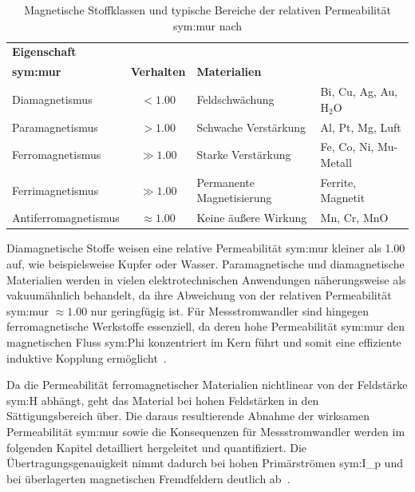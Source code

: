 \begin{table}[H]
    \centering
    \caption{Magnetische Stoffklassen und typische Bereiche der relativen Permeabilität \gls{sym:mur} nach \cite[Tab.~48]{book-Taschenbuch_Physik-Kuchling}}
    \label{tab:magnetische_stoffeigenschaften}
    \begin{tabularx}{\linewidth}{l c l X}
        \toprule
        \textbf{Eigenschaft} & 
        \thead{\textbf{Permeabilität}                                                                                  \\ \textbf{\gls{sym:mur}}} & 
        \textbf{Verhalten}   & 
        \textbf{Materialien}                                                                                           \\ 
        \midrule
        Diamagnetismus       & $< \num{1,00}$       & Feldschwächung            & Bi, Cu, Ag, Au, $\text{H}_2\text{O}$ \\
        Paramagnetismus      & $> \num{1,00}$       & Schwache Verstärkung      & Al, Pt, Mg, Luft                     \\
        Ferromagnetismus     & $\gg \num{1,00}$     & Starke Verstärkung        & Fe, Co, Ni, Mu-Metall                \\
        Ferrimagnetismus     & $\gg \num{1,00}$     & Permanente Magnetisierung & Ferrite, Magnetit                    \\
        Antiferromagnetismus & $\approx \num{1,00}$ & Keine äußere Wirkung      & Mn, Cr, MnO                          \\
        \bottomrule
    \end{tabularx}
\end{table}

Diamagnetische Stoffe weisen eine relative Permeabilität \gls{sym:mur} kleiner als \num{1,00} auf, wie beispielsweise Kupfer oder Wasser. Paramagnetische und diamagnetische Materialien werden in vielen elektrotechnischen Anwendungen näherungsweise als vakuumähnlich behandelt, da ihre Abweichung von der relativen Permeabilität \gls{sym:mur} $\approx \num{1,00}$ nur geringfügig ist. Für Messstromwandler sind hingegen ferromagnetische Werkstoffe essenziell, da deren hohe Permeabilität \gls{sym:mur} den magnetischen Fluss \gls{sym:Phi} konzentriert im Kern führt und somit eine effiziente induktive Kopplung ermöglicht~\cite[Tab.~48]{book-Taschenbuch_Physik-Kuchling}\cite[S.~63]{book-Technologie_Messwandler-Minkner}.

Da die Permeabilität ferromagnetischer Materialien nichtlinear von der Feldstärke \gls{sym:H} abhängt, geht das Material bei hohen Feldstärken in den Sättigungsbereich über. Die daraus resultierende Abnahme der wirksamen Permeabilität \gls{sym:mur} sowie die Konsequenzen für Messstromwandler werden im folgenden Kapitel detailliert hergeleitet und quantifiziert. Die Übertragungsgenauigkeit nimmt dadurch bei hohen Primärströmen \gls{sym:I_p} und bei überlagerten magnetischen Fremdfeldern deutlich ab~\cite[Kap.~11]{book-Magnetisches_Feld_Moeller-Harriehausen}\cite[S.~73]{book-Technologie_Messwandler-Minkner}.

